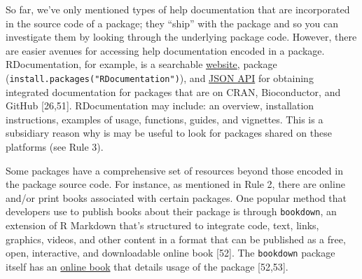 \documentclass[10pt,letterpaper]{article}
\begin{document}
So far, we've only mentioned types of help documentation that are
incorporated in the source code of a package; they ``ship'' with the
package and so you can investigate them by looking through the
underlying package code. However, there are easier avenues for accessing
help documentation encoded in a package. RDocumentation, for example, is
a searchable \href{https://www.rdocumentation.org/}{website}, package
(\texttt{install.packages("RDocumentation")}), and
\href{https://www.rdocumentation.org/docs/}{JSON API} for obtaining
integrated documentation for packages that are on CRAN, Bioconductor,
and GitHub {[}26,51{]}. RDocumentation may include: an overview,
installation instructions, examples of usage, functions, guides, and
vignettes. This is a subsidiary reason why is may be useful to look for
packages shared on these platforms (see Rule 3).

Some packages have a comprehensive set of resources beyond those encoded
in the package source code. For instance, as mentioned in Rule 2, there
are online and/or print books associated with certain packages. One
popular method that developers use to publish books about their package
is through \texttt{bookdown}, an extension of R Markdown that's
structured to integrate code, text, links, graphics, videos, and other
content in a format that can be published as a free, open, interactive,
and downloadable online book {[}52{]}. The \texttt{bookdown} package
itself has an \href{https://bookdown.org/yihui/bookdown/}{online book}
that details usage of the package {[}52,53{]}.
\end{document}
